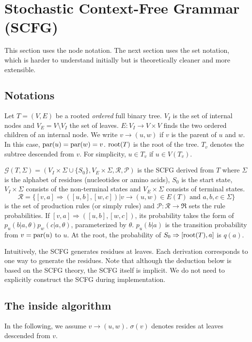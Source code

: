 \documentclass[10pt]{article}
\begin{document}
\section{Stochastic Context-Free Grammar (SCFG)}

This section uses the node notation. The next section uses the set notation,
which is harder to understand initially but is theoretically cleaner and more
extensible.

\subsection{Notations}

Let $T=(V,E)$ be a rooted \emph{ordered} full binary tree.
$V_I$ is the set of internal nodes and $V_E=V\setminus V_I$ the set of leaves.
$E:V_I\to V\times V$ finds the two ordered children of an internal node.
We write $v\to(u,w)$ if $v$ is the parent of $u$ and $w$.
In this case, ${\rm par}(u)={\rm par}(w)=v$.
${\rm root}(T)$ is the root of the tree.
$T_v$ denotes the subtree descended from $v$.
For simplicity, $u\in T_v$ if $u\in V(T_v)$.

$\mathcal{G}(T,\Sigma)=(V_I\times\Sigma\cup\{S_0\},V_E\times\Sigma,\mathcal{R},\mathcal{P})$ is the SCFG derived from $T$
where $\Sigma$ is the alphabet of residues (nucleotides or amino acids), $S_0$ is the start state,
$V_I\times\Sigma$ consists of the non-terminal states
and $V_E\times\Sigma$ consists of terminal states.
$$
\mathcal{R}=\{[v,a]\Rightarrow([u,b],[w,c])|\mbox{$v\to(u,w)\in E(T)$ and $a,b,c\in\Sigma$}\}
$$
is the set of production rules (or simply rules) and $\mathcal{P}:\mathcal{R}\to\Re$ sets the rule probabilities.
If $[v,a]\Rightarrow([u,b],[w,c])$, its probability takes the form of $p_u(b|a,\theta)p_w(c|a,\theta)$,
parameterized by $\theta$.
$p_u(b|a)$ is the transition probability from $v={\rm par}(u)$ to $u$.
At the root, the probability of $S_0\Rightarrow[{\rm root}(T),a]$ is $q(a)$.

Intuitively, the SCFG generates residues at leaves.
Each derivation corresponds to one way to generate the residues.
Note that although the deduction below is based on the SCFG theory, the SCFG itself is implicit.
We do not need to explicitly construct the SCFG during implementation.

\subsection{The inside algorithm}

In the following, we assume $v\to(u,w)$.
$\sigma(v)$ denotes resides at leaves descended from $v$.
\end{document}
